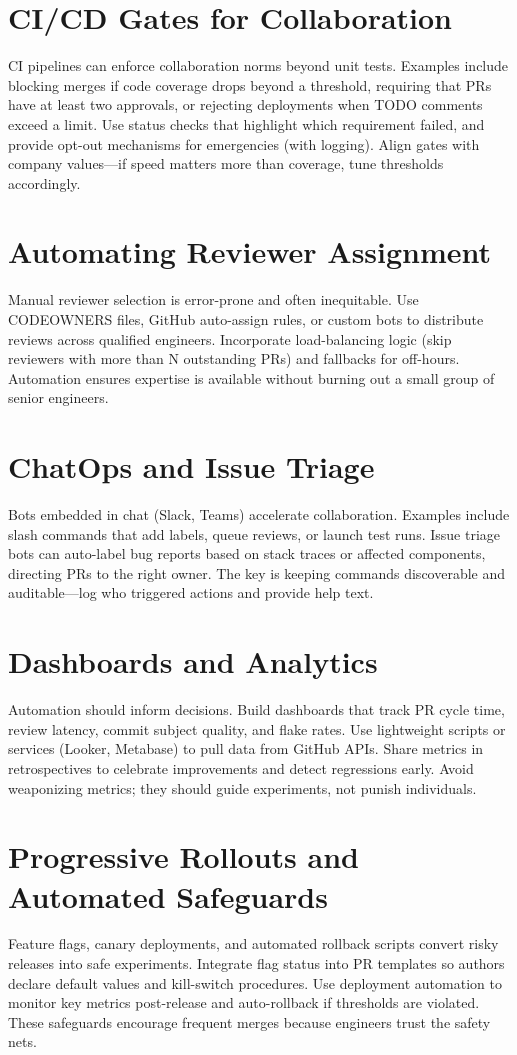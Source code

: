 \section{CI/CD Gates for Collaboration}
CI pipelines can enforce collaboration norms beyond unit tests. Examples include blocking merges if code coverage drops beyond a threshold, requiring that PRs have at least two approvals, or rejecting deployments when TODO comments exceed a limit. Use status checks that highlight which requirement failed, and provide opt-out mechanisms for emergencies (with logging). Align gates with company values---if speed matters more than coverage, tune thresholds accordingly.

\section{Automating Reviewer Assignment}
Manual reviewer selection is error-prone and often inequitable. Use CODEOWNERS files, GitHub auto-assign rules, or custom bots to distribute reviews across qualified engineers. Incorporate load-balancing logic (skip reviewers with more than N outstanding PRs) and fallbacks for off-hours. Automation ensures expertise is available without burning out a small group of senior engineers.

\section{ChatOps and Issue Triage}
Bots embedded in chat (Slack, Teams) accelerate collaboration. Examples include slash commands that add labels, queue reviews, or launch test runs. Issue triage bots can auto-label bug reports based on stack traces or affected components, directing PRs to the right owner. The key is keeping commands discoverable and auditable---log who triggered actions and provide help text.

\section{Dashboards and Analytics}
Automation should inform decisions. Build dashboards that track PR cycle time, review latency, commit subject quality, and flake rates. Use lightweight scripts or services (Looker, Metabase) to pull data from GitHub APIs. Share metrics in retrospectives to celebrate improvements and detect regressions early. Avoid weaponizing metrics; they should guide experiments, not punish individuals.

\section{Progressive Rollouts and Automated Safeguards}
Feature flags, canary deployments, and automated rollback scripts convert risky releases into safe experiments. Integrate flag status into PR templates so authors declare default values and kill-switch procedures. Use deployment automation to monitor key metrics post-release and auto-rollback if thresholds are violated. These safeguards encourage frequent merges because engineers trust the safety nets.

